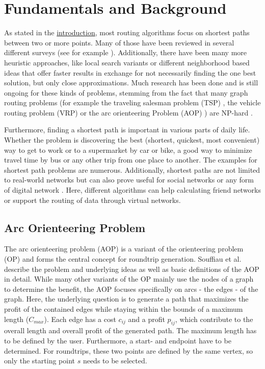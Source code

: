 \chapter{Fundamentals and Background}
\label{chapter:fundamentals}

As stated in the \href{chapter:introduction}{introduction}, most routing algorithms focus on shortest paths between two or more points.
Many of those have been reviewed in several different surveys (see for example \cite{madkour_survey_2017, wayahdi_greedy_2021}).
Additionally, there have been many more heuristic approaches, like local search variants \cite{braysy_vehicle_2005, irnich_sequential_2006, ropke_heuristic_2005} or different neighborhood based ideas \cite{braysy_vehicle_2005, irnich_sequential_2006, ropke_heuristic_2005} that offer faster results in exchange for not necessarily finding the one best solution, but only close approximations.
Much research has been done and is still ongoing for these kinds of problems, stemming from the fact that many graph routing problems (for example the traveling salesman problem (TSP) \cite{gendreau_handbook_2010}, the vehicle routing problem (VRP)  \cite{braysy_vehicle_2005, irnich_sequential_2006} or the arc orienteering Problem (AOP) \cite{agarwal_correlated_2023, buchin_tour4me_2022}) are NP-hard \cite{reinelt_traveling_2003}.
 
Furthermore, finding a shortest path is important in various parts of daily life.
Whether the problem is discovering the best (shortest, quickest, most convenient) way to get to work or to a supermarket by car or bike, a good way to minimize travel time by bus or any other trip from one place to another.
The examples for shortest path problems are numerous.
Additionally, shortest paths are not limited to real-world networks but can also prove useful for social networks or any form of digital network \cite{potamias_fast_2009}.
Here, different algorithms can help calculating friend networks or support the routing of data through virtual networks. 

\section{Arc Orienteering Problem}
\label{sec:aop}

The arc orienteering problem (AOP) is a variant of the orienteering problem (OP) and forms the central concept for roundtrip generation.
Souffiau et al.\ \cite{souffriau_planning_2011} describe the problem and underlying ideas as well as basic definitions of the AOP in detail.
While many other variants of the OP mainly use the nodes of a graph to determine the benefit, the AOP focuses specifically on arcs - the edges - of the graph.
Here, the underlying question is to generate a path that maximizes the profit of the contained edges while staying within the bounds of a maximum length ($C_{max}$). 
Each edge has a cost $c_{ij}$ and a profit $p_{ij}$, which contribute to the overall length and overall profit of the generated path.
The maximum length has to be defined by the user.
Furthermore, a start- and endpoint have to be determined.
For roundtrips, these two points are defined by the same vertex, so only the starting point $s$ needs to be selected.

